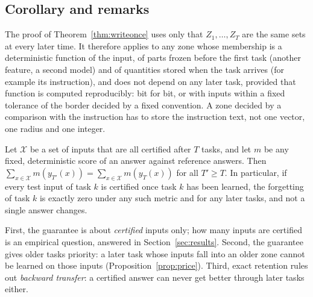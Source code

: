 \subsection{Corollary and remarks}
\begin{remark}
\label{rem:otherzones}
The proof of Theorem~\ref{thm:writeonce} uses only that $Z_1,\dots,Z_T$ are the same sets at every later time. It therefore applies to any zone whose membership is a
deterministic function of the input, of parts frozen before the first task (another feature, a second model) and of quantities stored when the task arrives
(for example its instruction), and does not depend on any later task, provided that function is computed reproducibly: bit for bit, or with inputs within a fixed tolerance of the border decided by a fixed convention.
A zone decided by a comparison with the instruction has to store the instruction text, not one vector, one radius and one integer.
\end{remark}
\begin{corollary}
\label{cor:zero}
Let $\mathcal{X}$ be a set of inputs that are all certified after $T$ tasks, and let $m$ be any fixed, deterministic score of an
answer against reference answers. Then $\sum_{x \in \mathcal{X}} m(y_{T'}(x)) = \sum_{x \in \mathcal{X}} m(y_T(x))$ for all
$T' \ge T$. In particular, if every test input of task $k$ is certified once task $k$ has been
learned, the forgetting of task $k$ is exactly zero under any such metric and for any later tasks, and
not a single answer changes.
\end{corollary}
\begin{remark}
First, the guarantee is about \emph{certified} inputs only; how many inputs are certified is an
empirical question, answered in Section~\ref{sec:results}. Second, the guarantee gives older tasks
priority: a later task whose inputs fall into an older zone cannot be learned on those inputs
(Proposition~\ref{prop:price}). Third, exact retention rules out \emph{backward transfer}: a
certified answer can never get better through later tasks either.
\end{remark}

